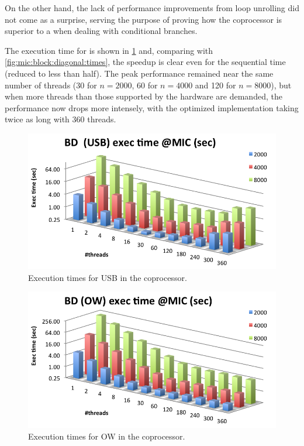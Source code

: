 \documentclass[../thesis]{subfiles}
\begin{document}
	On the other hand, the lack of performance improvements from loop unrolling did not come as a surprise, serving the purpose of proving how the \intel\xeonphi coprocessor is superior to a \gpu when dealing with conditional branches.

	The execution time for \usb is shown in \cref{fig:mic:optims:usb:times} and, comparing with \cref{fig:mic:block:diagonal:times}, the speedup is clear even for the sequential time (reduced to less than half). The peak performance remained near the same number of threads (30 for $n=2000$, 60 for $n=4000$ and 120 for $n=8000$), but when more threads than those supported by the hardware are demanded, the performance now drops more intensely, with the optimized implementation taking twice as long with 360 threads.

	\begin{figure}[p]
		\centering
		\includegraphics[height=0.25\textheight]{assets/images/mic/optims/mic-usb-times.png}
		\caption{Execution times for USB in the \intel\xeonphi coprocessor.}
		\label{fig:mic:optims:usb:times}
	\end{figure}
	
	\begin{figure}[p]
		\centering
		\includegraphics[height=0.25\textheight]{assets/images/mic/optims/mic-ow-times.png}
		\caption{Execution times for OW in the \intel\xeonphi coprocessor.}
		\label{fig:mic:optims:ow:times}
	\end{figure}
\end{document}
